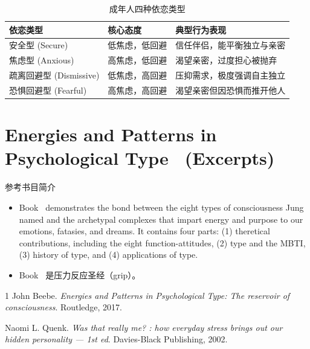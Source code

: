 \documentclass[UTF8,letter,10pt]{ctexart}
\begin{document}
\begin{table}[h]
\caption{成年人四种依恋类型}
\centering
\begin{tabular}{|l|l|l|}
\hline
\textbf{依恋类型} & \textbf{核心态度} & \textbf{典型行为表现} \\ \hline
安全型 (Secure) & 低焦虑，低回避 & 信任伴侣，能平衡独立与亲密 \\ \hline
焦虑型 (Anxious) & 高焦虑，低回避 & 渴望亲密，过度担心被抛弃 \\ \hline
疏离回避型 (Dismissive) & 低焦虑，高回避 & 压抑需求，极度强调自主独立 \\ \hline
恐惧回避型 (Fearful) & 高焦虑，高回避 & 渴望亲密但因恐惧而推开他人 \\ \hline
\end{tabular}
\end{table}


\clearpage

\part{Energies and Patterns in Psychological Type~\cite{beebe} (Excerpts)}



\clearpage
参考书目简介
\begin{itemize}

	\item Book~\cite{beebe} demonstrates the bond between the eight
		types of consciousness Jung named and the archetypal complexes
		that impart energy and purpose to our emotions, fatasies, and
		dreams.
		It contains four parts: (1) theretical contributions, including the eight
		function-attitudes, (2) type and the MBTI, (3) history of type, and (4)
		applications of type.

    \item Book~\cite{naomi} 是压力反应圣经（grip）。

\end{itemize}

\begin{thebibliography}{1}
     John Beebe.
    \textit{Energies and Patterns in Psychological Type: The reservoir of consciousness}.
    Routledge, 2017.

 Naomi L. Quenk.
    \textit{Was that really me? : how everyday stress brings out our hidden personality — 1st ed}.
    Davies-Black Publishing, 2002.
\end{thebibliography}
\end{document}
